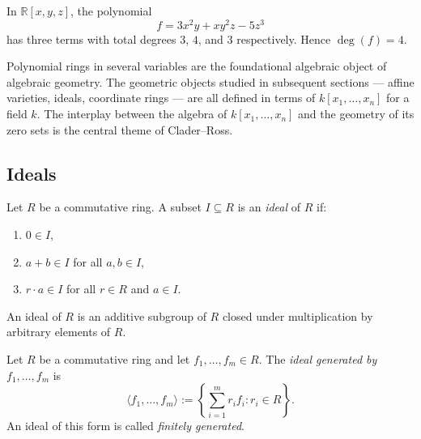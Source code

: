 \begin{example*}[Example]
In $\mathbb{R}[x,y,z]$, the polynomial
\[
f = 3x^2 y + xy^2 z - 5z^3
\]
has three terms with total degrees $3$, $4$, and $3$ respectively.
Hence $\deg(f) = 4$.
\end{example*}

\begin{remark*}
Polynomial rings in several variables are the foundational
algebraic object of algebraic geometry.
The geometric objects studied in subsequent sections ---
affine varieties, ideals, coordinate rings ---
are all defined in terms of $k[x_1, \dots, x_n]$
for a field $k$.
The interplay between the algebra of $k[x_1,\dots,x_n]$
and the geometry of its zero sets is the central theme
of Clader--Ross.
\end{remark*}

\subsection*{Ideals}

\begin{definition}[Ideal]
\label{def:ideal}
Let $R$ be a commutative ring.
A subset $I \subseteq R$ is an \emph{ideal} of $R$ if:
\begin{enumerate}
\item $0 \in I$,
\item $a + b \in I$ for all $a, b \in I$,
\item $r \cdot a \in I$ for all $r \in R$ and $a \in I$.
\end{enumerate}
\end{definition}

\begin{remark*}
An ideal of $R$ is an additive subgroup of $R$ closed under multiplication by
arbitrary elements of $R$.
\end{remark*}

\begin{definition}
\label{def:generated-ideal}
Let $R$ be a commutative ring and let $f_1, \dots, f_m \in R$.
The \emph{ideal generated by} $f_1, \dots, f_m$ is
\[
\langle f_1, \dots, f_m \rangle
:= \left\{ \sum_{i=1}^m r_i f_i : r_i \in R \right\}.
\]
An ideal of this form is called \emph{finitely generated}.
\end{definition}

